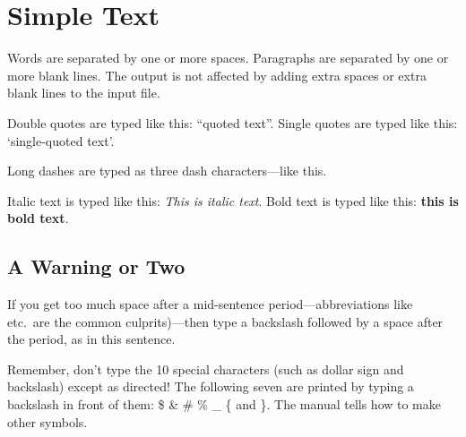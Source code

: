 \documentclass[11pt]{article}  %
\begin{document}

\section{Simple Text}          %

Words are separated by one or    more      spaces.  Paragraphs are
    separated by one or more blank lines.  The output is not affected
by adding extra spaces or extra blank lines to the input file.


Double quotes are typed like this: ``quoted text''.
Single quotes are typed like this: `single-quoted text'.

Long dashes are typed as three dash characters---like this.

Italic text is typed like this: \textit{This is italic text}.
Bold   text is typed like this: \textbf{this is  bold  text}.

\subsection{A Warning or Two}        %

If you get too much space after a mid-sentence period---abbreviations
like etc.\ are the common culprits)---then type a backslash followed by
a space after the period, as in this sentence.

Remember, don't type the 10 special characters (such as dollar sign and
backslash) except as directed!  The following seven are printed by
typing a backslash in front of them:  \$  \&  \#  \%  \_  \{  and  \}.
The manual tells how to make other symbols.
\end{document}
